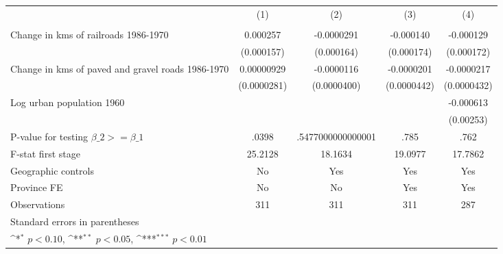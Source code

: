{
\def\sym#1{\ifmmode^{#1}\else\(^{#1}\)\fi}
\begin{tabular}{l*{4}{c}}
\hline\hline
                &\multicolumn{1}{c}{(1)}&\multicolumn{1}{c}{(2)}&\multicolumn{1}{c}{(3)}&\multicolumn{1}{c}{(4)}\\
                &\multicolumn{1}{c}{}&\multicolumn{1}{c}{}&\multicolumn{1}{c}{}&\multicolumn{1}{c}{}\\
\hline
Change in kms of railroads 1986-1970& 0.000257         &-0.0000291         &-0.000140         &-0.000129         \\
                &(0.000157)         &(0.000164)         &(0.000174)         &(0.000172)         \\
[1em]
Change in kms of paved and gravel roads 1986-1970&0.00000929         &-0.0000116         &-0.0000201         &-0.0000217         \\
                &(0.0000281)         &(0.0000400)         &(0.0000442)         &(0.0000432)         \\
[1em]
Log urban population 1960&                  &                  &                  &-0.000613         \\
                &                  &                  &                  &(0.00253)         \\
\hline
P-value for testing $\beta\_{2} >= \beta\_{1}$&    .0398         &.5477000000000001         &     .785         &     .762         \\
F-stat first stage&  25.2128         &  18.1634         &  19.0977         &  17.7862         \\
Geographic controls&       No         &      Yes         &      Yes         &      Yes         \\
Province FE     &       No         &       No         &      Yes         &      Yes         \\
Observations    &      311         &      311         &      311         &      287         \\
\hline\hline
\multicolumn{5}{l}{\footnotesize Standard errors in parentheses}\\
\multicolumn{5}{l}{\footnotesize \sym{*} \(p<0.10\), \sym{**} \(p<0.05\), \sym{***} \(p<0.01\)}\\
\end{tabular}
}
